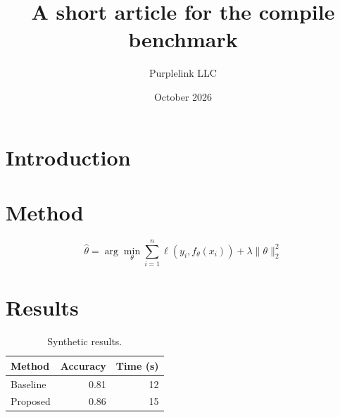 \documentclass[11pt]{article}
\title{A short article for the compile benchmark}
\author{Purplelink LLC}
\date{October 2026}
\begin{document}
\maketitle
\begin{abstract}\lipsum[1]\end{abstract}
\section{Introduction}
\lipsum[2-5]

\section{Method}
\lipsum[6-8]
\begin{equation}
  \hat{\theta} = \arg\min_{\theta} \sum_{i=1}^{n} \ell(y_i, f_\theta(x_i)) + \lambda \lVert\theta\rVert_2^2
\end{equation}
\lipsum[9-10]
\section{Results}
\begin{table}[h]
\centering
\begin{tabular}{lrr}
\toprule
Method & Accuracy & Time (s)\\
\midrule
Baseline & 0.81 & 12\\
Proposed & 0.86 & 15\\
\bottomrule
\end{tabular}
\caption{Synthetic results.}
\end{table}
\lipsum[11-16]
\end{document}

